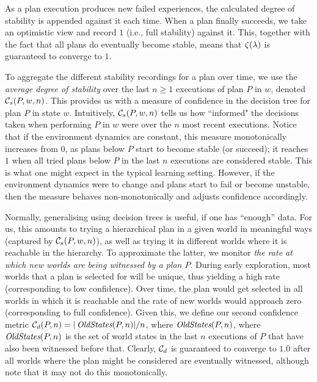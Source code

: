 \begin{algorithm}[h]
\caption{$\UpdateDegreeStability(\lambda)$}
\label{alg:degree}
\end{algorithm}


As a plan execution produces new failed experiences, the calculated degree of stability is appended against it each time. When a plan finally succeeds, we take an optimistic view and record $1$ (i.e., full stability) against it. This, together with the fact that all plans do eventually become stable, means that $\zeta(\lambda)$ is guaranteed to converge to $1$. 


To aggregate the different stability recordings for a plan over time, we use the \emph{average degree of stability} over the last $n \geq 1$ executions of plan $P$ in $w$, denoted ${\mathcal{C}}_s(P,w,n)$. 
This provides us with a measure of confidence in the decision tree for plan $P$ in state $w$. Intuitively, ${\mathcal{C}}_s(P,w,n)$ tells us how ``informed" the decisions taken when performing $P$ in $w$ were over the $n$ most recent executions.
Notice that if the environment dynamics are constant, this measure monotonically increases from $0$, as plans below $P$ start to become stable (or succeed); it reaches $1$ when all tried plans below $P$ in the last $n$ executions are considered stable. This is what one might expect in the typical learning setting. However, if the environment dynamics were to change and plans start to fail or become unstable, then the measure behaves non-monotonically and adjusts confidence accordingly.

\newcommand{\oldw}{\mathname{OldStates}}
Normally, generalising using decision trees is useful, if one has ``enough'' data. For us, this amounts to trying a hierarchical plan in a given world in meaningful ways (captured by ${\mathcal{C}}_s(P,w,n)$), as well as trying it in different worlds where it is reachable in the hierarchy. To approximate the latter, we monitor {\em the rate at which new worlds are being witnessed by a  plan $P$}. During early exploration, most worlds that a plan is selected for will be unique, thus yielding a high rate (corresponding to low confidence). Over time, the plan would get selected in all worlds in which it is reachable and the rate of new worlds would approach zero (corresponding to full confidence). Given this, we define our second confidence metric $\C_d(P,n) = |\oldw(P,n)|/n$, where $\oldw(P,n)$, where $\oldw(P,n)$ is the set of world states in the last $n$ executions of $P$ that have also been witnessed before that. Clearly, ${\mathcal{C}}_d$ is guaranteed to converge to $1.0$ after all worlds where the plan might be considered are eventually witnessed, although note that it may not do this monotonically.

